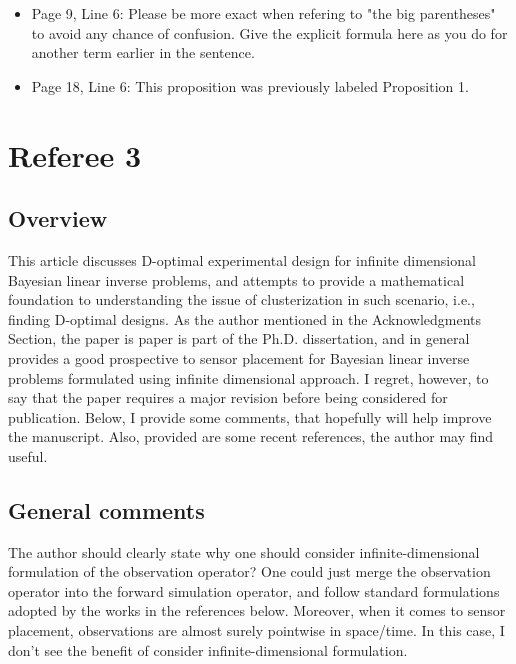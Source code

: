 \documentclass{amsart}
\begin{document}
\begin{itemize}
\item Page 9, Line 6: Please be more exact when refering to "the big
  parentheses" to avoid any chance of confusion. Give the explicit
  formula here as you do for another term earlier in the sentence.
  
\item Page 18, Line 6: This proposition was previously labeled
  Proposition 1. 
\end{itemize}




\section{Referee 3}

\subsection{Overview}

This article discusses D-optimal experimental design for infinite
dimensional Bayesian linear inverse problems, and attempts to provide
a mathematical foundation to understanding the issue of clusterization
in such scenario, i.e., finding D-optimal designs.  As the author
mentioned in the Acknowledgments Section, the paper is paper is part
of the Ph.D. dissertation, and in general provides a good prospective
to sensor placement for Bayesian linear inverse problems formulated
using infinite dimensional approach.  I regret, however, to say that
the paper requires a major revision before being considered for
publication.  Below, I provide some comments, that hopefully will help
improve the manuscript.  Also, provided are some recent references,
the author may find useful.


\subsection{General comments}

The author should clearly state why one should consider
infinite-dimensional formulation of the observation operator? One
could just merge the observation operator into the forward simulation
operator, and follow standard formulations adopted by the works in the
references below. Moreover, when it comes to sensor placement,
observations are almost surely pointwise in space/time. In this case,
I don't see the benefit of consider infinite-dimensional formulation.
\end{document}
